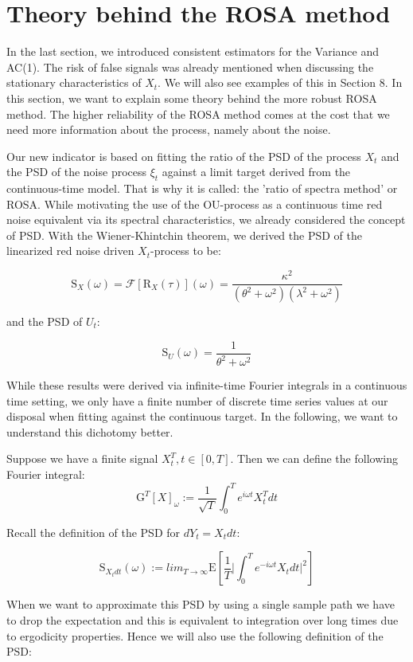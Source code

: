 \documentclass[%
thesis=student,%
coverpage=false,%
titlepage=false,%
headmarks=true, %
english,%
font=libertine, %
math=newpxtx, %
BCOR=5mm,%
coverBCOR=11mm%
]{tumbook}
\begin{document}
\chapter{Theory behind the ROSA method}

In the last section, we introduced consistent estimators for the Variance and AC(1). The risk of false signals was already mentioned when discussing the stationary characteristics of $X_{t}$. We will also see examples of this in Section 8. In this section, we want to explain some theory behind the more robust ROSA method. The higher reliability of the ROSA method comes at the cost that we need more information about the process, namely about the noise. 

Our new indicator is based on fitting the ratio of the PSD of the process $X_{t}$ and the PSD of the noise process $\xi_{t}$ against a limit target derived from the continuous-time model. That is why it is called: the 'ratio of spectra method' or ROSA. While motivating the use of the OU-process as a continuous time red noise equivalent via its spectral characteristics, we already considered the concept of PSD. With the Wiener-Khintchin theorem, we derived the PSD of the linearized red noise driven $X_{t}$-process to be:

\[
\mathrm{S}_{X}(\omega) = \mathcal{F}[\mathrm{R}_{X}(\tau)](\omega) = \frac{\kappa^{2}}{(\theta^{2} + \omega^{2})(\lambda^{2} + \omega^{2})}
\]

and the PSD of $U_{t}$:

\[
\mathrm{S}_{U}(\omega) = \frac{1}{\theta^2 + \omega^2}
\]

While these results were derived via infinite-time Fourier integrals in a continuous time setting, we only have a finite number of discrete time series values at our disposal when fitting against the continuous target. In the following, we want to understand this dichotomy better.

Suppose we have a finite signal $X_{t}^{T}, t \in [0,T]$. Then we can define the following Fourier integral: 
\[
    \mathrm{G}^{T}[X]_{\omega} := \frac{1}{\sqrt{T}}\int_{0}^{T}e^{i \omega t}X_{t}^{T}dt
\]

Recall the definition of the PSD for $dY_{t} = X_{t}dt$:

\[
\mathrm{S}_{X_{t}dt}(\omega) := lim_{T\rightarrow\infty}\mathrm{E}[\frac{1}{T}\lvert\int_{0}^{T}e^{-i\omega t}X_{t}dt \rvert^{2}]
\]

When we want to approximate this PSD by using a single sample path we have to drop the expectation and this is equivalent to integration over long times due to ergodicity properties. Hence we will also use the following definition of the PSD:
\end{document}
